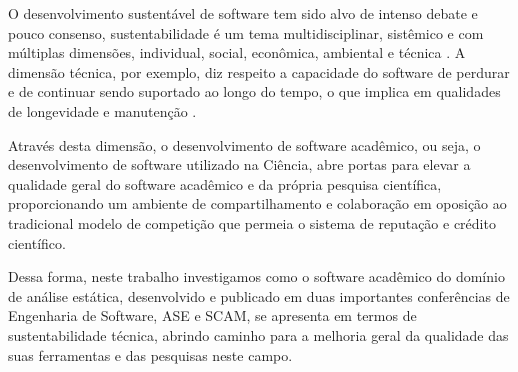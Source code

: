 

O desenvolvimento sustentável de software tem sido alvo de intenso debate e
pouco consenso, sustentabilidade é um tema multidisciplinar, sistêmico e com
múltiplas dimensões, individual, social, econômica, ambiental e técnica
\cite{becker2014karlskrona}. A dimensão técnica, por exemplo, diz respeito a
capacidade do software de perdurar e de continuar sendo suportado ao longo do
tempo, o que implica em qualidades de longevidade e manutenção
\cite{venters2014software}.

Através desta dimensão, o desenvolvimento de software acadêmico, ou
seja, o desenvolvimento de software utilizado na Ciência, abre portas
para elevar a qualidade geral do software acadêmico e da própria pesquisa científica, proporcionando
um ambiente de compartilhamento e colaboração em oposição ao tradicional modelo
de competição que permeia o sistema de reputação e crédito científico.


Dessa forma, neste trabalho investigamos como o software acadêmico do domínio
de análise estática, desenvolvido e publicado em duas importantes conferências
de Engenharia de Software, ASE e SCAM, se apresenta em termos de
sustentabilidade técnica, abrindo caminho para a melhoria geral da
qualidade das suas ferramentas e das pesquisas neste campo.



